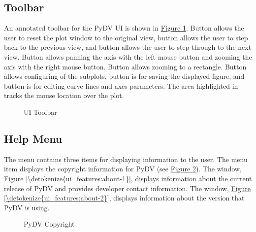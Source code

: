 \documentclass[letterpaper,10pt,english]{sphinxmanual}
\begin{document}
\subsection{Toolbar}
\label{\detokenize{ui_features:toolbar}}
An annotated toolbar for the PyDV UI is shown in \hyperref[\detokenize{ui_features:id2}]{Figure \ref{\detokenize{ui_features:id2}}}. Button  allows the user to reset the plot window to the original view, button  allows the user to step back to the previous view, and button  allows the user to step through to the next view. Button  allows panning the axis with the left mouse button and zooming the axis with the right mouse button. Button  allows zooming to a rectangle. Button  allows configuring of the subplots, button  is for saving the displayed figure, and button  is for editing curve lines and axes parameters. The area highlighted in  tracks the mouse location over the plot.

\begin{figure}[htbp]
\centering
\capstart

\noindent{}
\caption{UI Toolbar}\label{\detokenize{ui_features:id4}}\label{\detokenize{ui_features:id2}}\end{figure}


\subsection{Help Menu}
\label{\detokenize{ui_features:help-menu}}
The  menu contains three items for displaying information to the user. The  menu item displays the copyright information for PyDV (see \hyperref[\detokenize{ui_features:copyright}]{Figure \ref{\detokenize{ui_features:copyright}}}). The  window, \hyperref[\detokenize{ui_features:about-1}]{Figure \ref{\detokenize{ui_features:about-1}}}, displays information about the current release of PyDV and provides developer contact information. The  window, \hyperref[\detokenize{ui_features:about-2}]{Figure \ref{\detokenize{ui_features:about-2}}}, displays information about the  version that PyDV is using.

\begin{figure}[htbp]
\centering
\capstart

\noindent{}
\caption{PyDV Copyright}\label{\detokenize{ui_features:id5}}\label{\detokenize{ui_features:copyright}}\end{figure}
\end{document}
